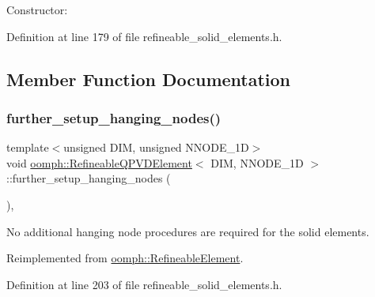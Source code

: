Constructor\+: 



Definition at line 179 of file refineable\+\_\+solid\+\_\+elements.\+h.



\subsection{Member Function Documentation}
\mbox{\label{classoomph_1_1RefineableQPVDElement_a6dc2a635636482702ae303b114b1d0a4}} 
\subsubsection{\texorpdfstring{further\+\_\+setup\+\_\+hanging\+\_\+nodes()}{further\_setup\_hanging\_nodes()}}
{\footnotesize\ttfamily template$<$unsigned D\+IM, unsigned N\+N\+O\+D\+E\+\_\+1D$>$ \\
void \hyperlink{classoomph_1_1RefineableQPVDElement}{oomph\+::\+Refineable\+Q\+P\+V\+D\+Element}$<$ D\+IM, N\+N\+O\+D\+E\+\_\+1D $>$\+::further\+\_\+setup\+\_\+hanging\+\_\+nodes (\begin{DoxyParamCaption}{ }\end{DoxyParamCaption})\hspace{0.3cm}{\ttfamily [inline]}, {\ttfamily [virtual]}}



No additional hanging node procedures are required for the solid elements. 



Reimplemented from \hyperlink{classoomph_1_1RefineableElement_a86ea01c485f7ff822dce74b884312ccb}{oomph\+::\+Refineable\+Element}.



Definition at line 203 of file refineable\+\_\+solid\+\_\+elements.\+h.

\mbox{\label{classoomph_1_1RefineableQPVDElement_ac4d601c414cfba398fc4e6c51c7e9817}} 
